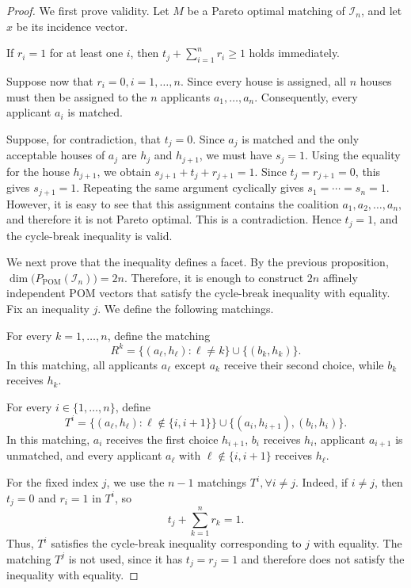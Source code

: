 \documentclass[12pt]{report}
\numberwithin{algorithm}{chapter}
\begin{document}
	\begin{proof}
		We first prove validity. Let $M$ be a Pareto optimal matching of $\mathcal{I}_n$, and let $x$ be its incidence vector.
		
		If $r_i=1$ for at least one $i$, then
		$t_j+\sum_{i=1}^{n}r_i\ge 1$
		holds immediately.
		
		Suppose now that
		$r_i=0,i=1,\ldots,n.$
		Since every house is assigned, all $n$ houses must then be assigned to the $n$ applicants $a_1,\ldots,a_n$. Consequently, every applicant $a_i$ is matched.
		
		Suppose, for contradiction, that $t_j=0$. Since $a_j$ is matched and the only acceptable houses of $a_j$ are $h_j$ and $h_{j+1}$, we must have
		$s_j=1.$
		Using the equality for the house $h_{j+1}$, we obtain
		$s_{j+1}+t_j+r_{j+1}=1.$
		Since $t_j=r_{j+1}=0$, this gives
		$s_{j+1}=1.$
		Repeating the same argument cyclically gives
		$s_1=\cdots=s_n=1.$
		However, it is easy to see that this assignment contains the coalition
		$a_1,a_2,\ldots,a_n,$
		and therefore it is not Pareto optimal. This is a contradiction. Hence $t_j=1$, and the cycle-break inequality is valid.
		
		We next prove that the inequality defines a facet. By the previous proposition,
		$\dim\bigl(P_{\mathrm{POM}}(\mathcal{I}_n)\bigr)=2n.$
		Therefore, it is enough to construct $2n$ affinely independent POM vectors that satisfy the cycle-break inequality with equality. Fix an inequality $j$. We define the following matchings.
		
		For every $k=1,\ldots,n$, define the matching
		\begin{equation}
			R^k
			=
			\{(a_\ell,h_\ell):\ell\ne k\}
			\cup
			\{(b_k,h_k)\}.
		\end{equation}
		In this matching, all applicants $a_\ell$ except $a_k$ receive their second choice, while $b_k$ receives $h_k$.
		
		For every $i\in\{1,\ldots,n\}$, define
		\begin{equation}
			T^i
			=
			\{(a_\ell,h_\ell):\ell\notin\{i,i+1\}\}
			\cup
			\{(a_i,h_{i+1}),(b_i,h_i)\}.
		\end{equation}
		In this matching, $a_i$ receives the first choice $h_{i+1}$,
		$b_i$ receives $h_i$, applicant $a_{i+1}$ is unmatched, and every
		applicant $a_\ell$ with $\ell\notin\{i,i+1\}$ receives $h_\ell$.
		
		For the fixed index $j$, we use the $n-1$ matchings $T^i, \forall i\ne j$.
		Indeed, if $i\ne j$, then $t_j=0$ and $r_i=1$ in $T^i$, so
		\[
		t_j+\sum_{k=1}^{n}r_k=1.
		\]
		Thus, $T^i$ satisfies the cycle-break inequality corresponding to $j$
		with equality. The matching $T^j$ is not used, since it has
		$t_j=r_j=1$ and therefore does not satisfy the inequality with equality.
		

\end{proof}
\end{document}
